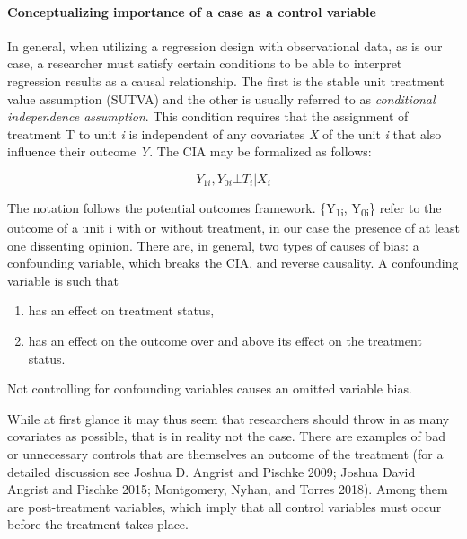 \documentclass[
  11pt,
]{article}
\providecommand{\tightlist}{%
  \setlength{\itemsep}{0pt}\setlength{\parskip}{0pt}}
\begin{document}
\hypertarget{conceptualizing-importance-of-a-case-as-a-control-variable}{%
\paragraph{Conceptualizing importance of a case as a control
variable}\label{conceptualizing-importance-of-a-case-as-a-control-variable}}

In general, when utilizing a regression design with observational data,
as is our case, a researcher must satisfy certain conditions to be able
to interpret regression results as a causal relationship. The first is
the stable unit treatment value assumption (SUTVA) and the other is
usually referred to as \emph{conditional independence assumption}. This
condition requires that the assignment of treatment T to unit \emph{i}
is independent of any covariates \emph{X} of the unit \emph{i} that also
influence their outcome \emph{Y}. The CIA may be formalized as follows:

\[
{Y_{1i}, Y_{0i}} {\bot} T_{i}|X_{i}
\]

The notation follows the potential outcomes framework.
\{Y\textsubscript{1i}, Y\textsubscript{0i}\} refer to the outcome of a
unit i with or without treatment, in our case the presence of at least
one dissenting opinion. There are, in general, two types of causes of
bias: a confounding variable, which breaks the CIA, and reverse
causality. A confounding variable is such that

\begin{enumerate}
\def\labelenumi{(\arabic{enumi})}
\tightlist
\item
  has an effect on treatment status,
\item
  has an effect on the outcome over and above its effect on the
  treatment status.
\end{enumerate}

Not controlling for confounding variables causes an omitted variable
bias.

While at first glance it may thus seem that researchers should throw in
as many covariates as possible, that is in reality not the case. There
are examples of bad or unnecessary controls that are themselves an
outcome of the treatment (for a detailed discussion see Joshua D.
Angrist and Pischke 2009; Joshua David Angrist and Pischke 2015;
Montgomery, Nyhan, and Torres 2018). Among them are post-treatment
variables, which imply that all control variables must occur before the
treatment takes place.
\end{document}
